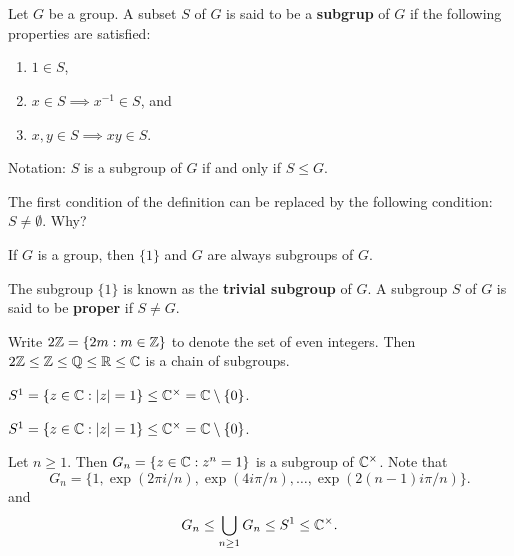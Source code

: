 \chapter{}



\begin{definition}
    Let $G$ be a group. 
        A subset $S$ of $G$ is said to be a \textbf{subgrup} of $G$ 
        if the following properties are satisfied:
        \begin{enumerate}
                \item $1\in S$,
                \item $x\in S\implies x^{-1}\in S$, and 
                \item $x,y\in S\implies xy\in S$.
        \end{enumerate}
        Notation: $S$ is a subgroup of $G$ if and only if $S\leq G$.
\end{definition}

The first condition of the definition can be replaced by
the following condition: $S\ne\emptyset$. Why? 

\begin{example}
    If $G$ is a group, then 
    $\{1\}$ and $G$ are always subgroups of $G$. 
\end{example}

The subgroup $\{1\}$ is known as the \textbf{trivial subgroup} of $G$. 
A subgroup $S$ of $G$ is said to be \textbf{proper} if $S\ne G$. 

\begin{example}
Write $2\mathbb{Z}=\{2m:m\in\mathbb{Z}\}$ to denote the set of even integers. Then 
$2\mathbb{Z}\leq\mathbb{Z}\leq\mathbb{Q}\leq\mathbb{R}\leq\mathbb{C}$ is a chain of subgroups. 
\end{example}

\begin{example}
$S^1=\{z\in\mathbb{C}:|z|=1\}\leq\mathbb{C}^\times=\mathbb{C}\setminus\{0\}$.
\end{example}

\begin{example}
$S^1=\{z\in\mathbb{C}:|z|=1\}\leq\mathbb{C}^\times=\mathbb{C}\setminus\{0\}$.
\end{example}

\begin{example}
Let $n\geq1$. Then $G_n=\{z\in\mathbb{C}:z^
n=1\}$ is a subgroup of $\mathbb{C}^\times$. 
Note that
\[
G_n=\{1,\exp(2\pi i/n),\exp(4i\pi/n),\dots,\exp(2(n-1)i\pi/n)\}.
\]
and 
\[
G_n\leq\bigcup_{n\geq1}G_n\leq S^1\leq\mathbb{C}^\times.
\]
\end{example}

